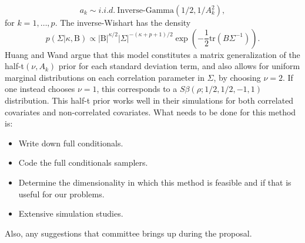 \begin{equation}
a_k \sim i.i.d.\ \text{Inverse-Gamma}(1/2,1/A_k^2),
\end{equation} 
for $k=1,\dots,p$.  
The inverse-Wishart has the density 
\begin{equation}
p(\Sigma \vert \kappa, \text{B})\propto \vert \text{B}\vert^{\kappa/2}\vert\Sigma\vert^{-(\kappa+p+1)/2}\exp{(-\frac{1}{2}\text{tr}(B\Sigma^{-1}))}.
\end{equation}
Huang and Wand \cite{huang2013simple} argue that this model constitutes a matrix generalization of the half-t$(\nu, A_k)$ prior for each standard deviation term, and also allows for uniform marginal distributions on each correlation parameter in $\Sigma$, by choosing $\nu=2$. If one instead chooses $\nu=1$, this corresponds to a $S\beta(\rho;1/2,1/2,-1,1)$ distribution. This half-t prior works well in their simulations for both correlated covariates and non-correlated covariates.  
What needs to be done for this method is: 

\begin{itemize}
\item Write down full conditionals.
\item Code the full conditionals samplers. 
\item Determine the dimensionality in which this method is feasible and if that is useful for our problems.
\item Extensive simulation studies. 
\end{itemize}
Also, any suggestions that committee brings up during the proposal.

